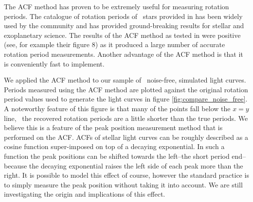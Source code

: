 The ACF method has proven to be extremely useful for measuring rotation
periods.
The catalogue of rotation periods of \Kepler\ stars provided in
\citet{Mcquillan2013} has been widely used by the community and has provided
ground-breaking results for stellar and exoplanetary science.
The results of the ACF method as tested in \citet{Aigrain2015} were positive
(see, for example their figure 8) as it produced a large number of accurate
rotation period measurements.
Another advantage of the ACF method is that it is conveniently fast to
implement.

We applied the ACF method to our sample of \nlightcurves\ noise-free,
simulated light curves.
Periods measured using the ACF method are plotted against the original
rotation period values used to generate the light curves in figure
\ref{fig:compare_noise_free}.
A noteworthy feature of this figure is that many of the points fall below the
$x=y$ line, \ie\ the recovered rotation periods are a little shorter than the
true periods.
We believe this is a feature of the peak position measurement method that is
performed on the ACF.
ACFs of stellar light curves can be roughly described as a cosine function
super-imposed on top of a decaying exponential.
In such a function the peak positions can be shifted towards the left--the
short period end--because the decaying exponential raises the left side of
each peak more than the right.
It is possible to model this effect of course, however the standard practice
is to simply measure the peak position without taking it into account.
We are still investigating the origin and implications of this effect.


